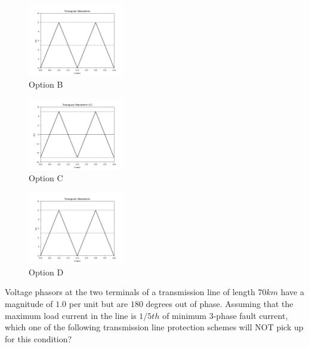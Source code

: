     \begin{figure}[h!]
    \centering
      \hspace{-1cm}
      \includegraphics[width=0.375\textwidth]{figs/Figure_1.png}
      
      \caption{Option B }
      \label{fig:your_label}
    \end{figure}

    \begin{figure}[h!]
    \centering
      \hspace{-1cm}
      \includegraphics[width=0.375\textwidth]{figs/Figure_3.png}
      
      \caption{Option C }
      \label{fig:your_label}
    \end{figure}

    \begin{figure}[h!]
    \centering
      \hspace{-1cm}
      \includegraphics[width=0.375\textwidth]{figs/Figure_1.png}
      \caption{Option D}
      \label{fig:your_label}
    \end{figure}

    \item Voltage phasors at the two terminals of a transmission line of length $70 km$ have a magnitude of $1.0$ per unit but are $180$ degrees out of phase. Assuming that the maximum load current in the line  
 is $1/5th$ of minimum $3$-phase fault current, which one of the following transmission line protection schemes will NOT pick up for this condition?  

